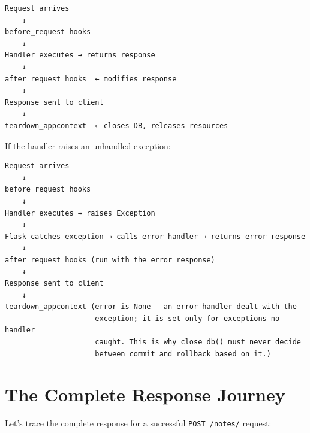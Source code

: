 \begin{outputbox}[short]
\begin{Verbatim}[fontsize=\codesize, breaklines, breakanywhere, breaksymbolleft={\tiny\textcolor{muted}{$\hookrightarrow$}}]
Request arrives
    ↓
before_request hooks
    ↓
Handler executes → returns response
    ↓
after_request hooks  ← modifies response
    ↓
Response sent to client
    ↓
teardown_appcontext  ← closes DB, releases resources
\end{Verbatim}
\end{outputbox}

\noindent{}If the handler raises an unhandled exception:

\begin{outputbox}[short]
\begin{Verbatim}[fontsize=\codesize, breaklines, breakanywhere, breaksymbolleft={\tiny\textcolor{muted}{$\hookrightarrow$}}]
Request arrives
    ↓
before_request hooks
    ↓
Handler executes → raises Exception
    ↓
Flask catches exception → calls error handler → returns error response
    ↓
after_request hooks (run with the error response)
    ↓
Response sent to client
    ↓
teardown_appcontext (error is None — an error handler dealt with the
                     exception; it is set only for exceptions no handler
                     caught. This is why close_db() must never decide
                     between commit and rollback based on it.)
\end{Verbatim}
\end{outputbox}

\setcounter{section}{7}
\section{The Complete Response Journey}\label{34-response-handling:348-the-complete-response-journey}

Let's trace the complete response for a successful \texttt{POST\ /notes/} request:


